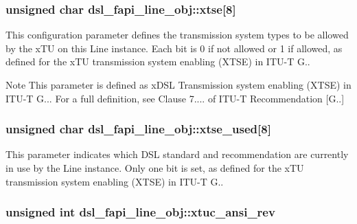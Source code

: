 \hypertarget{structdsl__fapi__line__obj_af8a2b118576e853690ab301ce3d05c63}{
\subsubsection[{xtse}]{\setlength{\rightskip}{0pt plus 5cm}unsigned char dsl\-\_\-fapi\-\_\-line\-\_\-obj\-::xtse\mbox{[}8\mbox{]}}}\label{structdsl__fapi__line__obj_af8a2b118576e853690ab301ce3d05c63}
This configuration parameter defines the transmission system types to be allowed by the x\-T\-U on this Line instance. Each bit is 0 if not allowed or 1 if allowed, as defined for the x\-T\-U transmission system enabling (X\-T\-S\-E) in I\-T\-U-\/\-T G.. \begin{DoxyNote}{Note}
This parameter is defined as x\-D\-S\-L Transmission system enabling (X\-T\-S\-E) in I\-T\-U-\/\-T G... For a full definition, see Clause 7.... of I\-T\-U-\/\-T Recommendation \mbox{[}G..\mbox{]} 
\end{DoxyNote}
\hypertarget{structdsl__fapi__line__obj_ac3b19b16fda0753232eef0d9c9fcb624}{
\subsubsection[{xtse\-\_\-used}]{\setlength{\rightskip}{0pt plus 5cm}unsigned char dsl\-\_\-fapi\-\_\-line\-\_\-obj\-::xtse\-\_\-used\mbox{[}8\mbox{]}}}\label{structdsl__fapi__line__obj_ac3b19b16fda0753232eef0d9c9fcb624}
This parameter indicates which D\-S\-L standard and recommendation are currently in use by the Line instance. Only one bit is set, as defined for the x\-T\-U transmission system enabling (X\-T\-S\-E) in I\-T\-U-\/\-T G.. \hypertarget{structdsl__fapi__line__obj_a177b8d1be46871b866c0728df3f74545}{
\subsubsection[{xtuc\-\_\-ansi\-\_\-rev}]{\setlength{\rightskip}{0pt plus 5cm}unsigned int dsl\-\_\-fapi\-\_\-line\-\_\-obj\-::xtuc\-\_\-ansi\-\_\-rev}}\label{structdsl__fapi__line__obj_a177b8d1be46871b866c0728df3f74545}
